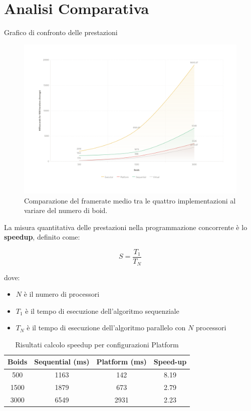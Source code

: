 \documentclass[a4paper,12pt]{report}
\begin{document}
\newpage

\section{Analisi Comparativa}
Grafico di confronto delle prestazioni
\begin{figure}[H]
    \centering
    \includegraphics[width=\textwidth]{img/performance_graph.png}
    \caption{Comparazione del framerate medio tra le quattro implementazioni al variare del numero di boid.}
    \label{fig:performance_comparison}
\end{figure}

La misura quantitativa delle prestazioni nella programmazione concorrente è lo \textbf{speedup}, definito come:

\[
S = \frac{T_1}{T_N}
\]

dove:
\begin{itemize}
    \item $N$ è il numero di processori
    \item $T_1$ è il tempo di esecuzione dell'algoritmo sequenziale
    \item $T_N$ è il tempo di esecuzione dell'algoritmo parallelo con $N$ processori
\end{itemize}

\begin{table}[h!]
    \centering
    \begin{tabular}{|c|c|c|c|}
    \hline
    \textbf{Boids}& \textbf{Sequential (ms)}& \textbf{Platform (ms)} & \textbf{Speed-up} \\
    \hline
    500  & 1163 & 142 & 8.19  \\
    1500 & 1879 & 673 & 2.79  \\
    3000 & 6549 & 2931 & 2.23 \\
    \hline
    \end{tabular}
    \caption{Risultati calcolo speedup per configurazioni Platform}

    \label{tab:platform-speedup}
\end{table}
\end{document}
